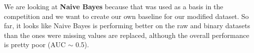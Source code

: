 \documentclass[a4paper,11pt]{article}
\begin{document}
We are looking at \textbf{Naive Bayes} because that was used as a basis in the competition and we want to create our own baseline for our modified dataset. So far, it looks like Naive Bayes is performing better on the raw and binary datasets than the ones were missing values are replaced, although the overall performance is pretty poor (AUC $\sim$ 0.5).


%
%
\end{document}
